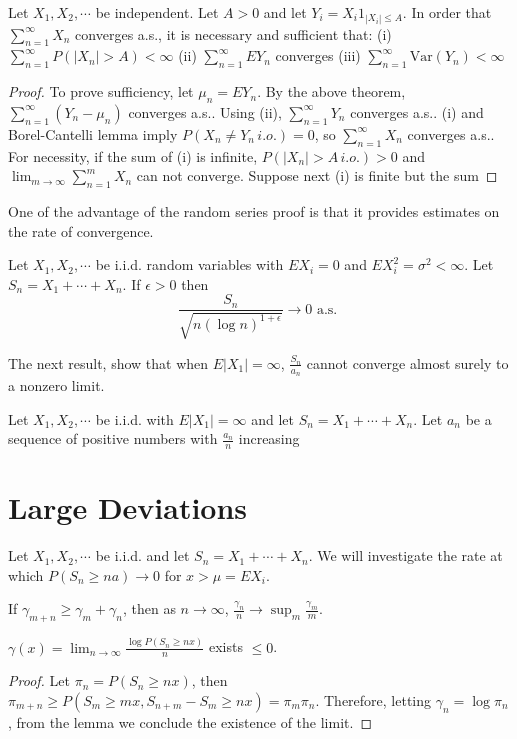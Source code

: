 \begin{theorem}
    Let $X_1,X_2,\cdots$ be independent. Let $A>0$ and let $Y_i=X_i1_{\left|X_i\right|\le A}$. In order that $\sum_{n=1}^\infty X_n$ converges a.s.,
    it is necessary and sufficient that:\newline 
    (i) $\sum_{n=1}^\infty P(\left|X_n\right|>A)<\infty$\newline 
    (ii) $\sum_{n=1}^\infty EY_n$ converges \newline 
    (iii) $\sum_{n=1}^\infty \text{Var}(Y_n)<\infty$
\end{theorem}
\begin{proof}
    To prove sufficiency, let $\mu_n=EY_n$. By the above theorem, $\sum_{n=1}^\infty(Y_n-\mu_n)$ converges a.s..
    Using (ii), $\sum_{n=1}^\infty Y_n$ converges a.s.. (i) and Borel-Cantelli lemma imply $P(X_n\ne Y_n\, i.o.)=0$, so $\sum_{n=1}^\infty X_n$ converges a.s..
    \newline 
    For necessity, if the sum of (i) is infinite, $P(\left|X_n\right|>A\, i.o.)>0$ and $\lim_{m\to\infty} \sum_{n=1}^m X_n$ can not converge.
    Suppose next (i) is finite but the sum 
\end{proof}

One of the advantage of the random series proof is that it provides estimates on the rate of convergence.
\begin{theorem}
    Let $X_1,X_2,\cdots$ be i.i.d. random variables with $EX_i=0$ and $EX_i^2=\sigma^2<\infty$. Let $S_n=X_1+\cdots+X_n$. If $\epsilon>0$ then 
    \[\frac{S_n}{\sqrt{n(\log n)^{1+\epsilon}}}\to 0\text{ a.s. }\]
\end{theorem}

The next result, show that when $E\left|X_1\right|=\infty$, $\frac{S_n}{a_n}$ cannot converge almost surely to a nonzero limit.
\begin{theorem}
    Let $X_1,X_2,\cdots$ be i.i.d. with $E\left|X_1\right|=\infty$ and let $S_n=X_1+\cdots+X_n$.
    Let $a_n$ be a sequence of positive numbers with $\frac{a_n}{n}$ increasing
\end{theorem}

\section{Large Deviations}
Let $X_1,X_2,\cdots$ be i.i.d. and let $S_n=X_1+\cdots+X_n$. We will investigate the rate at which $P(S_n\ge na)\to 0$ for $x>\mu=EX_i$.
\begin{lemma}
If $\gamma_{m+n}\ge\gamma_m+\gamma_n$, then as $n\to\infty$, $\frac{\gamma_n}{n}\to\sup_m\frac{\gamma_m}{m}$.
\end{lemma}
\begin{theorem}
$\gamma(x)=\lim_{n\to\infty}\frac{\log P(S_n\ge nx)}{n}$ exists $\le 0$.
\end{theorem}
\begin{proof}
Let $\pi_n=P(S_n\ge nx)$, then $\pi_{m+n}\ge P(S_m\ge mx,S_{n+m}-S_m\ge nx)=\pi_m\pi_n$. Therefore, letting $\gamma_n=\log\pi_n$, from the lemma we conclude the existence of the limit.
\end{proof}

